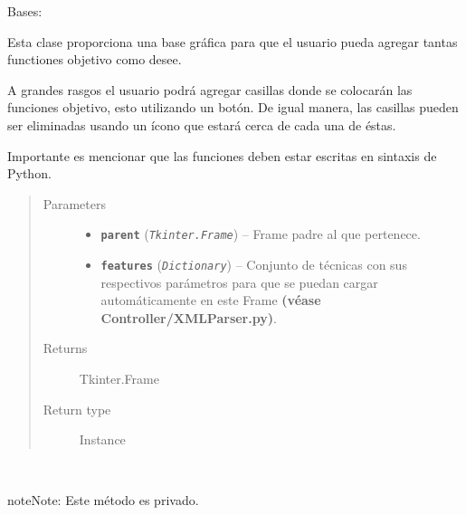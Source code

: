 \documentclass[letterpaper,10pt,english]{sphinxmanual}
\begin{document}
\begin{fulllineitems}
\label{View/Main/ObjectiveFunction/FunctionFrame:View.Main.ObjectiveFunction.FunctionFrame.FunctionFrame}
Bases: 

\begin{DUlineblock}{0em}
\item[] Esta clase proporciona una base gráfica para que el usuario pueda
agregar tantas functiones objetivo como desee.
\item[] A grandes rasgos el usuario podrá agregar casillas donde se colocarán las funciones
objetivo, esto utilizando un botón. De igual manera, las casillas pueden ser eliminadas
usando un ícono que estará cerca de cada una de éstas.
\item[] Importante es mencionar que las funciones deben estar escritas en sintaxis de Python.
\end{DUlineblock}
\begin{quote}\begin{description}
\item[{Parameters}] \leavevmode\begin{itemize}
\item {} 
\textbf{\texttt{parent}} (\emph{\texttt{Tkinter.Frame}}) -- Frame padre al que pertenece.

\item {} 
\textbf{\texttt{features}} (\emph{\texttt{Dictionary}}) -- Conjunto de técnicas con sus respectivos parámetros para que
se puedan cargar automáticamente en este Frame \textbf{(véase
Controller/XMLParser.py)}.

\end{itemize}

\item[{Returns}] \leavevmode
Tkinter.Frame

\item[{Return type}] \leavevmode
Instance

\end{description}\end{quote}

\begin{fulllineitems}
\label{View/Main/ObjectiveFunction/FunctionFrame:View.Main.ObjectiveFunction.FunctionFrame.FunctionFrame._FunctionFrame__add_function}~
\begin{notice}{note}{Note:}
Este método es privado.
\end{notice}


\end{fulllineitems}
\end{fulllineitems}
\end{document}
